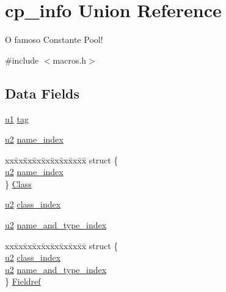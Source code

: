\hypertarget{structcp__info}{}\section{cp\+\_\+info Union Reference}
\label{structcp__info}


O famoso Constante Pool!  




{\ttfamily \#include $<$macros.\+h$>$}

\subsection*{Data Fields}
\begin{DoxyCompactItemize}
\item 
\hyperlink{macros_8h_a8026a39c502750413402a90d9d8bae3c}{u1} \hyperlink{structcp__info_a17726ed17c64ec8550633ebf17fd1a98}{tag}
\item 
\hyperlink{macros_8h_aa76d8c8015643c6a837661a10142016e}{u2} \hyperlink{structcp__info_ae939ac3ca00f5727beaa02d0e339183d}{name\+\_\+index}
\item 
\begin{tabbing}
xx\=xx\=xx\=xx\=xx\=xx\=xx\=xx\=xx\=\kill
struct \{\\
\>\hyperlink{macros_8h_aa76d8c8015643c6a837661a10142016e}{u2} \hyperlink{structcp__info_ae939ac3ca00f5727beaa02d0e339183d}{name\_index}\\
\} \hyperlink{structcp__info_a11b5ecef63a5c97db3b2f4c0596c4661}{Class}\\

\end{tabbing}\item 
\hyperlink{macros_8h_aa76d8c8015643c6a837661a10142016e}{u2} \hyperlink{structcp__info_a6004155348b07eae6cb68d413191efe9}{class\+\_\+index}
\item 
\hyperlink{macros_8h_aa76d8c8015643c6a837661a10142016e}{u2} \hyperlink{structcp__info_adec52fa6971122714e8d390dd4b38048}{name\+\_\+and\+\_\+type\+\_\+index}
\item 
\begin{tabbing}
xx\=xx\=xx\=xx\=xx\=xx\=xx\=xx\=xx\=\kill
struct \{\\
\>\hyperlink{macros_8h_aa76d8c8015643c6a837661a10142016e}{u2} \hyperlink{structcp__info_a6004155348b07eae6cb68d413191efe9}{class\_index}\\
\>\hyperlink{macros_8h_aa76d8c8015643c6a837661a10142016e}{u2} \hyperlink{structcp__info_adec52fa6971122714e8d390dd4b38048}{name\_and\_type\_index}\\
\} \hyperlink{structcp__info_a502706d84bee5271a2e861cf452e286d}{Fieldref}\\


\end{tabbing}
\end{DoxyCompactItemize}
